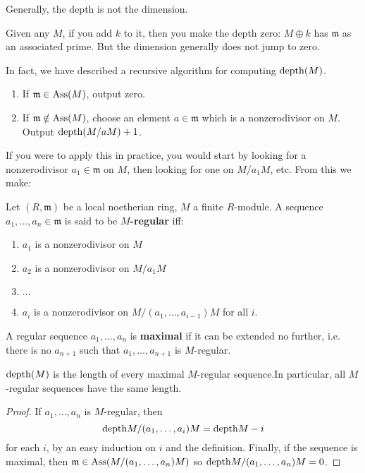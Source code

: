 Generally, the depth is not the dimension.
\begin{example}
Given any $M$, if you add $k$ to it, then you make the depth
zero: $M \oplus k$
has $\mathfrak{m}$ as an associated prime. But the dimension
generally does not
jump to zero.
\end{example}

In fact, we have described a recursive algorithm for computing
$\mathrm{depth}(M)$.
\begin{enumerate}
\item If $\mathfrak{m}  \in \operatorname{Ass}(M)$, output zero.
\item If $\mathfrak{m} \notin \operatorname{Ass}(M)$, choose an element $a
\in\mathfrak{m}$
which is a nonzerodivisor on $M$. Output $\mathrm{depth}(M/aM) +1$.
\end{enumerate}


If you were to apply this in practice, you would start by
looking for a
nonzerodivisor $a_1 \in \mathfrak{m}$ on $M$, then looking for
one on $M/a_1
M$, etc.
From this we make:

\begin{definition}
Let $(R, \mathfrak{m})$ be a local noetherian ring, $M$ a finite
$R$-module. A
sequence $a_1, \dots, a_n \in \mathfrak{m}$ is said to be
\textbf{$M$-regular} iff:
\begin{enumerate}
\item $a_1$ is a nonzerodivisor on $M$
\item $a_2$ is a nonzerodivisor on $M/a_1 M$
\item  $\dots$
\item $a_i$ is a nonzerodivisor on $M/(a_1, \dots, a_{i-1})M$
for all $i$.
\end{enumerate}
A regular sequence $a_1, \dots, a_n$ is \textbf{maximal } if it
can be extended
no further, i.e. there is no $a_{n+1}$ such that $a_1, \dots,
a_{n+1}$ is
$M$-regular.
\end{definition}

\begin{corollary}
$\mathrm{depth}(M)$ is the length of every maximal $M$-regular
sequence.In particular,
all $M$-regular sequences have the same length.
\end{corollary}

\begin{proof}
If $a_1, \dots, a_n$ is $M$-regular, then
\[ \mathrm{depth} M/(a_1, \dots, a_i)M = \mathrm{depth} M -i  \]
for each $i$, by an easy induction on $i$ and the definition.
Finally, if the sequence is maximal,
then $\mathfrak{m} \in \operatorname{Ass}(M/(a_1, \dots, a_n)M)$ so $\mathrm{depth}
M/(a_1, \dots,
a_n) M = 0$.
\end{proof}

